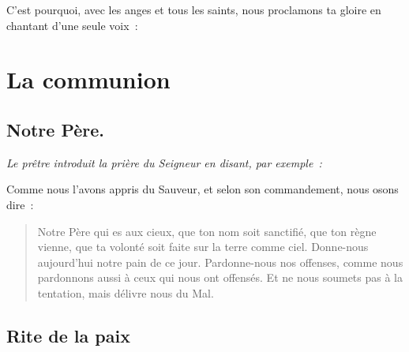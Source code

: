 C'est pourquoi, avec les anges et tous les saints, nous proclamons ta
gloire en chantant d'une seule voix~:










\section*{La communion}

\subsection*{Notre Père.}

\emph{Le prêtre introduit la prière du Seigneur en disant, par                  
exemple~: }

Comme nous l'avons appris du Sauveur, et selon son commandement, nous
osons dire~:

\begin{verse}
\noindent
Notre Père qui es aux cieux,\newline
que ton nom soit sanctifié,\newline
que ton règne vienne,\newline
que ta volonté soit faite\newline
sur la terre comme ciel.\newline
Donne-nous aujourd'hui\newline
notre pain de ce jour.\newline
Pardonne-nous nos offenses,\newline
comme nous pardonnons aussi\newline
à ceux qui nous ont offensés.\newline
Et ne nous soumets pas à la tentation,\newline
mais délivre nous du Mal.\newline
\end{verse}

\subsection*{Rite de la paix}

